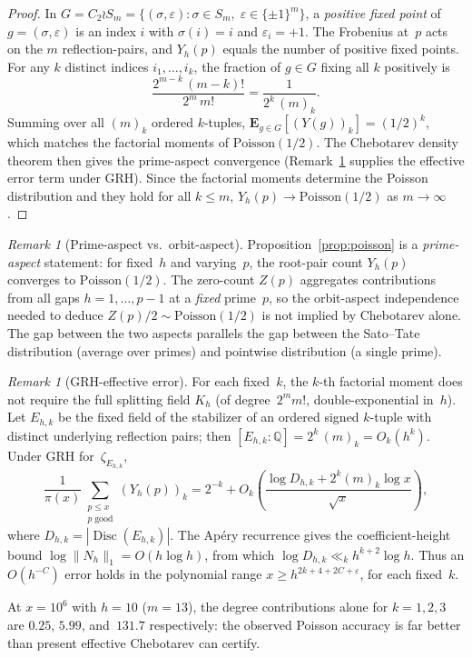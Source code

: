 \documentclass[11pt]{article}
\theoremstyle{definition}
\theoremstyle{remark}
\newtheorem{remark}[theorem]{Remark}
\begin{document}
\begin{proof}
In $G = C_2 \wr S_m = \{(\sigma,\varepsilon) :
\sigma \in S_m,\; \varepsilon \in \{\pm 1\}^m\}$,
a \emph{positive fixed point} of $g = (\sigma,\varepsilon)$
is an index $i$ with $\sigma(i) = i$ and $\varepsilon_i = +1$.
The Frobenius at~$p$ acts on the $m$ reflection-pairs,
and $Y_h(p)$ equals the number of positive fixed points.
For any $k$ distinct indices $i_1, \ldots, i_k$,
the fraction of $g \in G$ fixing all $k$ positively is
\[
\frac{2^{m-k}\,(m-k)!}{2^m\,m!} = \frac{1}{2^k\,(m)_k}.
\]
Summing over all $(m)_k$ ordered $k$-tuples,
$\mathbf{E}_{g \in G}[(Y(g))_k] = (1/2)^k$,
which matches the factorial moments of $\mathrm{Poisson}(1/2)$.
The Chebotarev density theorem then gives the
prime-aspect convergence
(Remark~\ref{rem:grh-effective} supplies the
effective error term under GRH).
Since the factorial moments determine the Poisson
distribution and they hold for all $k \le m$,
$Y_h(p) \to \mathrm{Poisson}(1/2)$ as $m \to \infty$.
\end{proof}

\begin{remark}[Prime-aspect vs.\ orbit-aspect]\label{rem:two-aspects}
Proposition~\ref{prop:poisson} is a \emph{prime-aspect} statement:
for fixed~$h$ and varying~$p$, the root-pair count $Y_h(p)$
converges to $\mathrm{Poisson}(1/2)$.
The zero-count $Z(p)$ aggregates contributions from
all gaps $h = 1, \ldots, p{-}1$ at a \emph{fixed} prime~$p$,
so the orbit-aspect independence needed to deduce
$Z(p)/2 \sim \mathrm{Poisson}(1/2)$ is not implied by
Chebotarev alone.
The gap between the two aspects parallels the gap between
the Sato--Tate distribution (average over primes) and
pointwise distribution (a single prime).
\end{remark}

\begin{remark}[GRH-effective error]\label{rem:grh-effective}
For each fixed~$k$, the $k$-th factorial moment
does not require the full splitting field
$K_h$ (of degree~$2^m m!$, double-exponential in~$h$).
Let $E_{h,k}$ be the fixed field of the
stabilizer of an ordered signed $k$-tuple
with distinct underlying reflection pairs;
then
$[E_{h,k}:\mathbb{Q}] = 2^k\,(m)_k = O_k(h^k)$.
Under GRH for~$\zeta_{E_{h,k}}$,
\[
\frac{1}{\pi(x)}
\sum_{\substack{p \le x \\ p\;\text{good}}}
(Y_h(p))_k
= 2^{-k}
+ O_k\!\left(
\frac{\log D_{h,k} + 2^k(m)_k\log x}{\sqrt{x}}
\right),
\]
where $D_{h,k} = |\operatorname{Disc}(E_{h,k})|$.
The Ap\'ery recurrence gives the
coefficient-height bound
$\log\|N_h\|_1 = O(h\log h)$,
from which
$\log D_{h,k} \ll_k h^{k+2}\log h$.
Thus an $O(h^{-C})$ error holds in the polynomial range
$x \ge h^{2k+4+2C+\varepsilon}$, for each fixed~$k$.

At $x = 10^6$ with $h = 10$ ($m = 13$),
the degree contributions alone for
$k = 1,2,3$ are $0.25$, $5.99$, and~$131.7$
respectively:
the observed Poisson accuracy is far better
than present effective Chebotarev can certify.
\end{remark}
\end{document}
